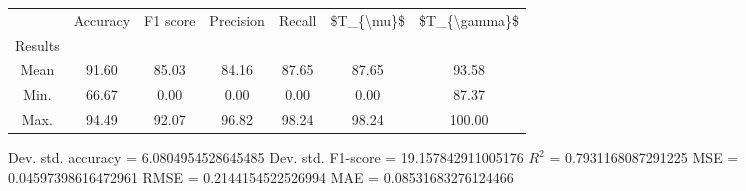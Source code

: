\begin{tabular}{|c|c|c|c|c|c|c|}
\toprule
{} &  Accuracy &  F1 score &  Precision &  Recall &  \$T\_\{\textbackslash mu\}\$ &  \$T\_\{\textbackslash gamma\}\$ \\
Results &           &           &            &         &            &               \\
\hline
Mean    &     91.60 &     85.03 &      84.16 &   87.65 &      87.65 &         93.58 \\
Min.    &     66.67 &      0.00 &       0.00 &    0.00 &       0.00 &         87.37 \\
Max.    &     94.49 &     92.07 &      96.82 &   98.24 &      98.24 &        100.00 \\
\bottomrule
\end{tabular}

 Dev. std. accuracy = 6.0804954528645485
 Dev. std. F1-score = 19.157842911005176
 $R^2$ = 0.7931168087291225
 MSE = 0.04597398616472961
 RMSE = 0.2144154522526994
 MAE = 0.08531683276124466